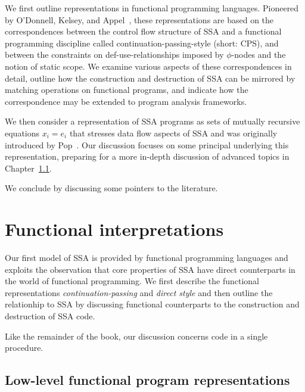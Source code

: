 We first outline representations in functional programming languages.
Pioneered by O'Donnell, Kelsey, and
Appel~\cite{ODonnellPhD,Kelsey95,Appel98:SSA}, these representations
are based on the correspondences between the control flow structure of
SSA and a functional programming discipline called
continuation-passing-style (short: CPS), and between the constraints
on def-use-relationships imposed by $\phi$-nodes and the notion of
static scope. We examine various aspects of these correspondences in
detail, outline how the construction and destruction of SSA can be
mirrored by matching operations on functional programs, and indicate
how the correspondence may be extended to program analysis frameworks.

We then consider a representation of SSA programs as sets of mutually
recursive equations $x_i = e_i$ that stresses data flow aspects of SSA
and was originally introduced by Pop~\cite{PopJS2007}.  Our discussion
focuses on some principal underlying this representation, preparing
for a more in-depth discussion of advanced topics in Chapter~\ref{}.

We conclude by discussing some pointers to the literature.


\section{Functional interpretations}
\label{section:Part1:Semantics:FunctionalLanguages}

Our first model of SSA is provided by functional programming languages
and exploits the observation that core properties of SSA have direct
counterparts in the world of functional programming.  We first
describe  the functional representations
\emph{continuation-passing} and \emph{direct style} and then outline
the relationhip to SSA by discussing functional counterparts to the
construction and destruction of SSA code.

Like the remainder of the book, our discussion concerns code in a
single procedure.

\subsection{Low-level functional program representations}

